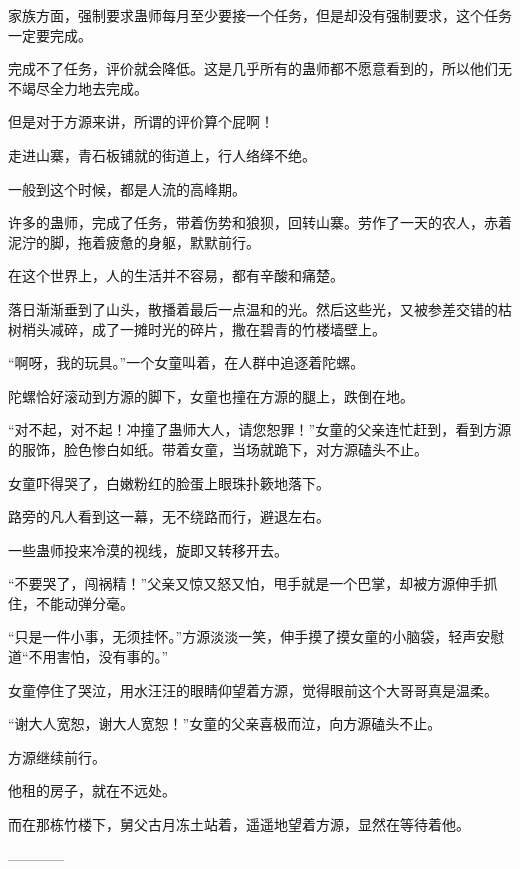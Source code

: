 \begin{this_body}
家族方面，强制要求蛊师每月至少要接一个任务，但是却没有强制要求，这个任务一定要完成。

完成不了任务，评价就会降低。这是几乎所有的蛊师都不愿意看到的，所以他们无不竭尽全力地去完成。

但是对于方源来讲，所谓的评价算个屁啊！

走进山寨，青石板铺就的街道上，行人络绎不绝。

一般到这个时候，都是人流的高峰期。

许多的蛊师，完成了任务，带着伤势和狼狈，回转山寨。劳作了一天的农人，赤着泥泞的脚，拖着疲惫的身躯，默默前行。

在这个世界上，人的生活并不容易，都有辛酸和痛楚。

落日渐渐垂到了山头，散播着最后一点温和的光。然后这些光，又被参差交错的枯树梢头减碎，成了一摊时光的碎片，撒在碧青的竹楼墙壁上。

“啊呀，我的玩具。”一个女童叫着，在人群中追逐着陀螺。

陀螺恰好滚动到方源的脚下，女童也撞在方源的腿上，跌倒在地。

“对不起，对不起！冲撞了蛊师大人，请您恕罪！”女童的父亲连忙赶到，看到方源的服饰，脸色惨白如纸。带着女童，当场就跪下，对方源磕头不止。

女童吓得哭了，白嫩粉红的脸蛋上眼珠扑簌地落下。

路旁的凡人看到这一幕，无不绕路而行，避退左右。

一些蛊师投来冷漠的视线，旋即又转移开去。

“不要哭了，闯祸精！”父亲又惊又怒又怕，甩手就是一个巴掌，却被方源伸手抓住，不能动弹分毫。

“只是一件小事，无须挂怀。”方源淡淡一笑，伸手摸了摸女童的小脑袋，轻声安慰道“不用害怕，没有事的。”

女童停住了哭泣，用水汪汪的眼睛仰望着方源，觉得眼前这个大哥哥真是温柔。

“谢大人宽恕，谢大人宽恕！”女童的父亲喜极而泣，向方源磕头不止。

方源继续前行。

他租的房子，就在不远处。

而在那栋竹楼下，舅父古月冻土站着，遥遥地望着方源，显然在等待着他。

------------

\end{this_body}

